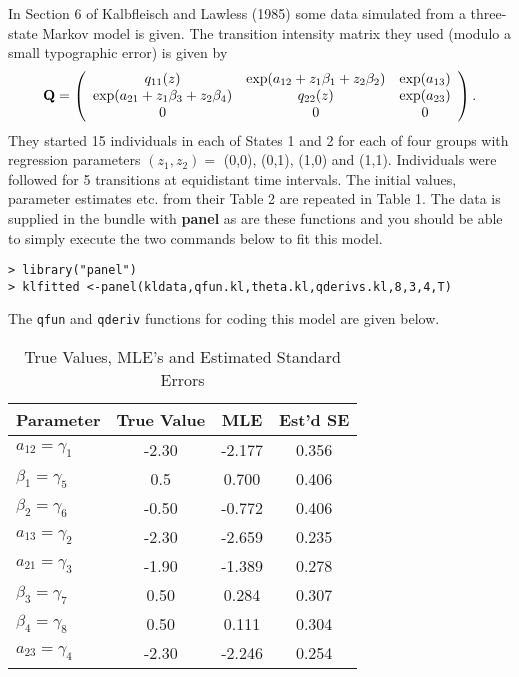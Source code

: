 \documentclass[12pt]{article}
\begin{document}
In Section 6 of Kalbfleisch and Lawless (1985) some data simulated from
a three-state Markov model is given.
The transition intensity matrix they used (modulo a small 
typographic error) is given by
\[
{\bf Q}  =  
\left( \begin{array}{cccc}
 q_{11}(z) & \exp(a_{12}+z_1 \beta_1 +z_2 \beta_2) & \exp(a_{13}) \\
 \exp(a_{21}+z_1 \beta_3 + z_2 \beta_4) & q_{22}(z) & \exp(a_{23}) \\
 0 & 0 &  0 \\
\end{array}
\right).
\]
They started 15 individuals in each of States 1 and 2 for each of four
groups with regression parameters $(z_1,z_2)=$ (0,0), (0,1), (1,0) and
(1,1).
Individuals were followed for 5 transitions at equidistant time intervals.
The initial values, parameter estimates etc. from their Table
2 are repeated in Table 1.
The data is supplied in the bundle with {\bf panel} as are these functions
and you should be able to simply execute the two commands below to 
fit this model.
\begin{verbatim}
> library("panel")
> klfitted <-panel(kldata,qfun.kl,theta.kl,qderivs.kl,8,3,4,T)
\end{verbatim}
The \verb+qfun+ and \verb+qderiv+ functions for coding this model are
given below.
\begin{table}[ht]
\caption{True Values, MLE's and Estimated Standard Errors}
\begin{center}
\begin{tabular}{|l|ccc|}
\hline
Parameter & True Value & MLE & Est'd SE \\
\hline
$a_{12}= \gamma_1 $ & -2.30 & -2.177 & 0.356 \\
$\beta_1=\gamma_5$ & 0.5 & 0.700 & 0.406 \\
$\beta_2=\gamma_6$ & -0.50 & -0.772 & 0.406 \\
$a_{13}=\gamma_2$ & -2.30 & -2.659 & 0.235 \\
$a_{21} =\gamma_3$ & -1.90 & -1.389 & 0.278 \\
$\beta_3=\gamma_7$ & 0.50 & 0.284 & 0.307 \\
$\beta_4=\gamma_8$ & 0.50 & 0.111 & 0.304 \\
$a_{23}=\gamma_4$ & -2.30 & -2.246 & 0.254 \\
\hline
\end{tabular}
\end{center}
\end{table}
\end{document}
